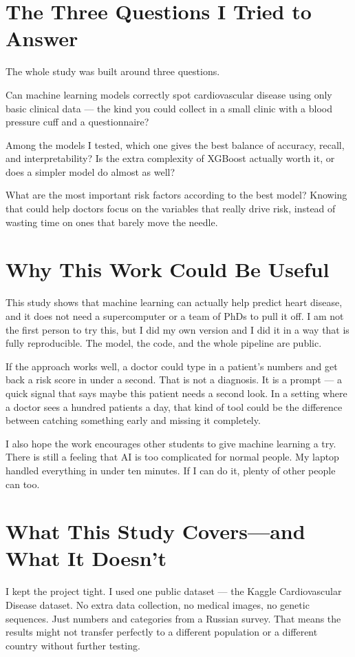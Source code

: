 \documentclass[12pt, a4paper, oneside]{book}
\begin{document}
\section{The Three Questions I Tried to Answer}
The whole study was built around three questions.

Can machine learning models correctly spot cardiovascular disease using only basic clinical data — the kind you could collect in a small clinic with a blood pressure cuff and a questionnaire?

Among the models I tested, which one gives the best balance of accuracy, recall, and interpretability? Is the extra complexity of XGBoost actually worth it, or does a simpler model do almost as well?

What are the most important risk factors according to the best model? Knowing that could help doctors focus on the variables that really drive risk, instead of wasting time on ones that barely move the needle.

\section{Why This Work Could Be Useful}
This study shows that machine learning can actually help predict heart disease, and it does not need a supercomputer or a team of PhDs to pull it off. I am not the first person to try this, but I did my own version and I did it in a way that is fully reproducible. The model, the code, and the whole pipeline are public.

If the approach works well, a doctor could type in a patient's numbers and get back a risk score in under a second. That is not a diagnosis. It is a prompt — a quick signal that says maybe this patient needs a second look. In a setting where a doctor sees a hundred patients a day, that kind of tool could be the difference between catching something early and missing it completely.

I also hope the work encourages other students to give machine learning a try. There is still a feeling that AI is too complicated for normal people. My laptop handled everything in under ten minutes. If I can do it, plenty of other people can too.

\section{What This Study Covers—and What It Doesn't}
I kept the project tight. I used one public dataset — the Kaggle Cardiovascular Disease dataset. No extra data collection, no medical images, no genetic sequences. Just numbers and categories from a Russian survey. That means the results might not transfer perfectly to a different population or a different country without further testing.
\end{document}

